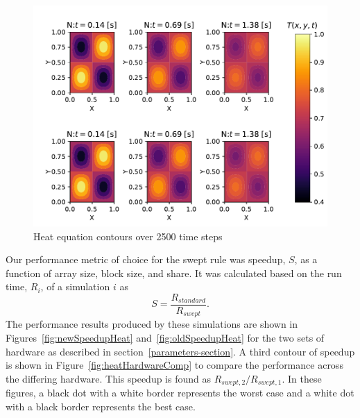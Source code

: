 \documentclass[review]{elsarticle}
\begin{document}
\begin{figure}[htb!]
    \centering
    \includegraphics{figs/heatValidate.pdf}
    \caption{Heat equation contours over 2500 time steps}
    \label{fig:heatSurface}
\end{figure}

Our performance metric of choice for the swept rule was speedup, $S$, as a function of array size, block size, and share. It was calculated based on the run time, $R_i$, of a simulation $i$ as
\begin{equation}
    S = \frac{R_{standard}}{R_{swept}}.
\end{equation}
The performance results produced by these simulations are shown in Figures~\ref{fig:newSpeedupHeat} and~\ref{fig:oldSpeedupHeat} for the two sets of hardware as described in section~\ref{parameters-section}. 
A third contour of speedup is shown in Figure~\ref{fig:heatHardwareComp} to compare the performance across the differing hardware. This speedup is found as $R_{swept,2}/R_{swept,1}$. In these figures, a black dot with a white border represents the worst case and a white dot with a black border represents the best case.
\end{document}
